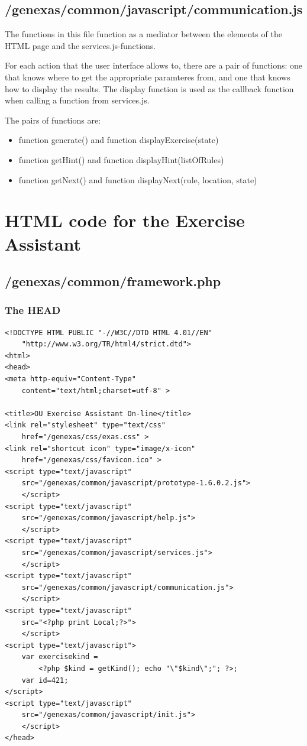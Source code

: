 \documentclass{article}
\begin{document}
\subsection{/genexas/common/javascript/communication.js}
The functions in this file function as a mediator between the elements of the HTML page and the services.js-functions. 

For each action that the user interface allows to, there are a pair of functions: one that knows where to get the appropriate paramteres from, and one that knows how to display the results. The display function is used as the callback function when calling a function from services.js.

The pairs of functions are:

\begin{itemize}
\item function generate() and function displayExercise(state)
\item function getHint() and function displayHint(listOfRules)
\item function getNext() and  function displayNext(rule, location, state) 
\end{itemize}

\appendix
\section{HTML code for the Exercise Assistant}
\subsection{/genexas/common/framework.php}\label{appendix:framework}
\subsubsection{The HEAD}
\begin{verbatim}
<!DOCTYPE HTML PUBLIC "-//W3C//DTD HTML 4.01//EN"
    "http://www.w3.org/TR/html4/strict.dtd">
<html>
<head>
<meta http-equiv="Content-Type" 
    content="text/html;charset=utf-8" >

<title>OU Exercise Assistant On-line</title>
<link rel="stylesheet" type="text/css" 
    href="/genexas/css/exas.css" >
<link rel="shortcut icon" type="image/x-icon" 
    href="/genexas/css/favicon.ico" >
<script type="text/javascript" 
    src="/genexas/common/javascript/prototype-1.6.0.2.js">
    </script> 
<script type="text/javascript" 
    src="/genexas/common/javascript/help.js">
    </script>
<script type="text/javascript" 
    src="/genexas/common/javascript/services.js">
    </script>
<script type="text/javascript" 
    src="/genexas/common/javascript/communication.js">
    </script>
<script type="text/javascript" 
    src="<?php print Local;?>">
    </script>
<script type="text/javascript">
    var exercisekind = 
        <?php $kind = getKind(); echo "\"$kind\";"; ?>; 
    var id=421;
</script>
<script type="text/javascript" 
    src="/genexas/common/javascript/init.js">
    </script>
</head>
\end{verbatim}
\end{document}
